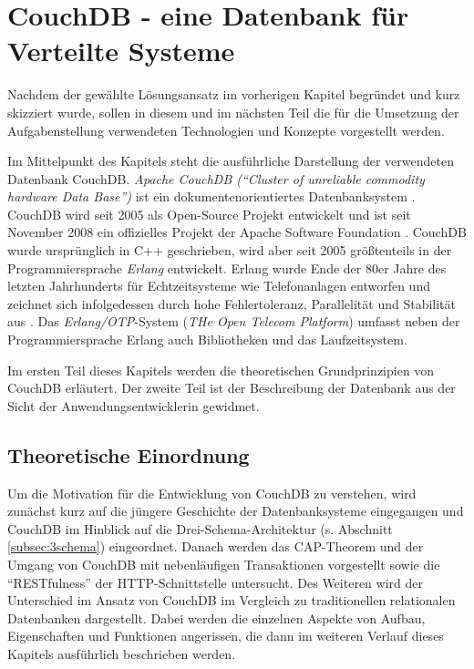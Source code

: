 \chapter{CouchDB - eine Datenbank für Verteilte Systeme}
\label{chap:couchdb}

Nachdem der gewählte Lösungsansatz im vorherigen Kapitel begründet und kurz skizziert wurde, sollen in diesem und im nächsten Teil die für die Umsetzung der Aufgabenstellung verwendeten Technologien und Konzepte vorgestellt werden. 

Im Mittelpunkt des Kapitels steht die ausführliche Darstellung der verwendeten Datenbank CouchDB. \textit{Apache CouchDB (\enquote{Cluster of unreliable commodity hardware Data Base})} ist ein dokumentenorientiertes Datenbanksystem \cite{couch:homepage}. CouchDB wird seit 2005 als Open-Source Projekt entwickelt und ist seit November 2008 ein offizielles Projekt der Apache Software Foundation \cite{couchdb:apache}. CouchDB wurde ursprünglich in C++ geschrieben, wird aber seit 2005 größtenteils in der Programmiersprache \textit{Erlang} \cite{erlang:homepage} entwickelt. Erlang wurde Ende der 80er Jahre des letzten Jahrhunderts für Echtzeitsysteme wie Telefonanlagen entworfen und zeichnet sich infolgedessen durch hohe Fehlertoleranz, Parallelität und Stabilität aus \cite{couchdb:ibm}. Das \textit{Erlang/OTP}-System (\textit{THe Open Telecom Platform}) umfasst neben der Programmiersprache Erlang auch Bibliotheken und das Laufzeitsystem.

Im ersten Teil dieses Kapitels werden die theoretischen Grundprinzipien von CouchDB erläutert. Der zweite Teil ist der Beschreibung der Datenbank aus der Sicht der Anwendungsentwicklerin gewidmet.


\section{Theoretische Einordnung}
\label{sec:theoretisch-couchdb}


Um die Motivation für die Entwicklung von CouchDB zu verstehen, wird zunächst kurz auf die jüngere Geschichte der Datenbanksysteme eingegangen und CouchDB im Hinblick auf die Drei-Schema-Architektur (s. Abschnitt \ref{subsec:3schema}) eingeordnet. Danach werden das CAP-Theorem und der Umgang von CouchDB mit nebenläufigen Transaktionen vorgestellt sowie die \enquote{RESTfulness} der HTTP-Schnittstelle untersucht. Des Weiteren wird der Unterschied im Ansatz von CouchDB im Vergleich zu traditionellen relationalen Datenbanken dargestellt. Dabei werden die einzelnen Aspekte von Aufbau, Eigenschaften und Funktionen angerissen, die dann im weiteren Verlauf dieses Kapitels ausführlich beschrieben werden. 


